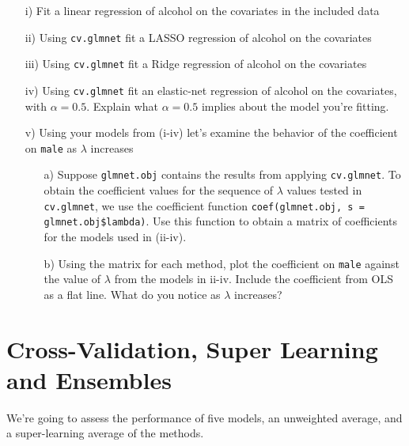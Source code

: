 \documentclass[letterpaper,12pt]{article}
\numberwithin{equation}{section}
\numberwithin{equation}{section}
\begin{document}
\begin{itemize}
\item[i)] Fit a linear regression of alcohol on the covariates in the included data
\item[ii)] Using {\tt cv.glmnet} fit a LASSO regression of alcohol on the covariates
\item[iii)] Using {\tt cv.glmnet} fit a Ridge regression of alcohol on the covariates
\item[iv)] Using {\tt cv.glmnet} fit an elastic-net regression of alcohol on the covariates, with $\alpha = 0.5$.  Explain what $\alpha = 0.5$ implies about the model you're fitting.
\item[v)] Using your models from (i-iv) let's examine the behavior of the coefficient on {\tt male} as $\lambda$ increases
\begin{itemize}
\item[a)] Suppose {\tt glmnet.obj} contains the results from applying {\tt cv.glmnet}.  To obtain the coefficient values for the sequence of $\lambda$ values tested in {\tt cv.glmnet}, we use the coefficient function {\tt coef(glmnet.obj, s = glmnet.obj\$lambda)}.  Use this function to obtain a matrix of coefficients for the models used in (ii-iv).
\item[b)] Using the matrix for each method, plot the coefficient on {\tt male} against the value of $\lambda$ from the models in ii-iv.  Include the coefficient from OLS as a flat line.  What do you notice as $\lambda$ increases?
\end{itemize}
\end{itemize}

\section{Cross-Validation, Super Learning and Ensembles}

We're going to assess the performance of five models, an unweighted average, and a super-learning average of the methods.
\end{document}

